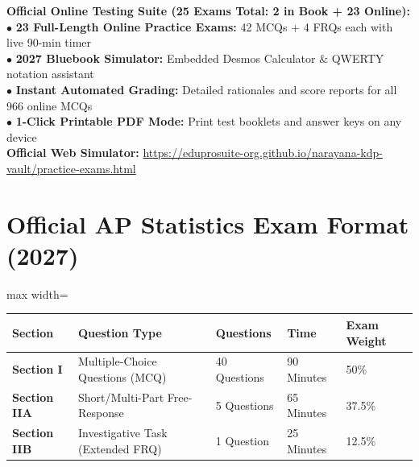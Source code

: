 \begin{center}
\begin{tcolorbox}[standard jigsaw,width=0.95\linewidth,colback=NavyBlue!5!white,colframe=NavyBlue,title=\textbf{FREE DIGITAL WEB COMPANION \& 23 EXAMS SIMULATOR}]
\begin{minipage}{0.95\linewidth}
  \textbf{Official Online Testing Suite (25 Exams Total: 2 in Book + 23 Online):}\\
  $\bullet$ \textbf{23 Full-Length Online Practice Exams:} 42 MCQs + 4 FRQs each with live 90-min timer\\
  $\bullet$ \textbf{2027 Bluebook Simulator:} Embedded Desmos Calculator \& QWERTY notation assistant\\
  $\bullet$ \textbf{Instant Automated Grading:} Detailed rationales and score reports for all 966 online MCQs\\
  $\bullet$ \textbf{1-Click Printable PDF Mode:} Print test booklets and answer keys on any device\\[6pt]
  \textbf{Official Web Simulator:} \url{https://eduprosuite-org.github.io/narayana-kdp-vault/practice-exams.html}
\end{minipage}
\end{tcolorbox}
\end{center}

\section*{Official AP Statistics Exam Format (2027)}
\begin{adjustbox}{max width=\linewidth}
\begin{tabular}{lllll}
\toprule
\textbf{Section} & \textbf{Question Type} & \textbf{Questions} & \textbf{Time} & \textbf{Exam Weight} \\
\midrule
\textbf{Section I} & Multiple-Choice Questions (MCQ) & 40 Questions & 90 Minutes & 50\% \\
\textbf{Section IIA} & Short/Multi-Part Free-Response & 5 Questions & 65 Minutes & 37.5\% \\
\textbf{Section IIB} & Investigative Task (Extended FRQ) & 1 Question & 25 Minutes & 12.5\% \\
\bottomrule
\end{tabular}
\end{adjustbox}


